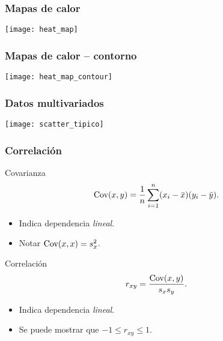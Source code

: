 \documentclass[table]{beamer}
\begin{document}
\begin{frame}
    \frametitle{Mapas de calor}
    \begin{center}
        \texttt{[image: heat\_map]}
    \end{center}
\end{frame}

\iffalse
\begin{frame}
    \frametitle{Mapas de calor}
    \begin{center}
        \texttt{[image: heatmap\_ameba]}
    \end{center}
\end{frame}
\fi

\begin{frame}
    \frametitle{Mapas de calor -- contorno}
    \begin{center}
        \texttt{[image: heat\_map\_contour]}
    \end{center}
\end{frame}

\iffalse
\begin{frame}
    \frametitle{Mapas de calor -- ¡cuidado!}
    \begin{center}
        \texttt{[image: heatmap]}
    \end{center}
\end{frame}
\fi

\begin{frame}
    \frametitle{Datos multivariados}
    \begin{center}
        \texttt{[image: scatter\_tipico]}
    \end{center}
\end{frame}

\begin{frame}
    \frametitle{Correlación}
    \begin{block}{Covarianza}
        \begin{equation*}
            \cov{x , y} = \frac{1}{n} \sum_{i = 1}^{n} \parens{x_{i} - \bar{x}} \parens{y_{i} - \bar{y}} .
        \end{equation*}
        \begin{itemize}
            \item Indica dependencia \emph{lineal}.
            \item Notar $\cov{x , x} = s_{x}^{2}$.
        \end{itemize}
    \end{block}
    \begin{block}{Correlación}
        \begin{equation*}
            r_{x y} = \frac{\cov{x , y}}{s_{x} s_{y}} .
        \end{equation*}
        \begin{itemize}
            \item Indica dependencia \emph{lineal}.
            \item Se puede mostrar que $-1 \leq r_{x y} \leq 1$.
        \end{itemize}
    \end{block}
\end{frame}
\end{document}
